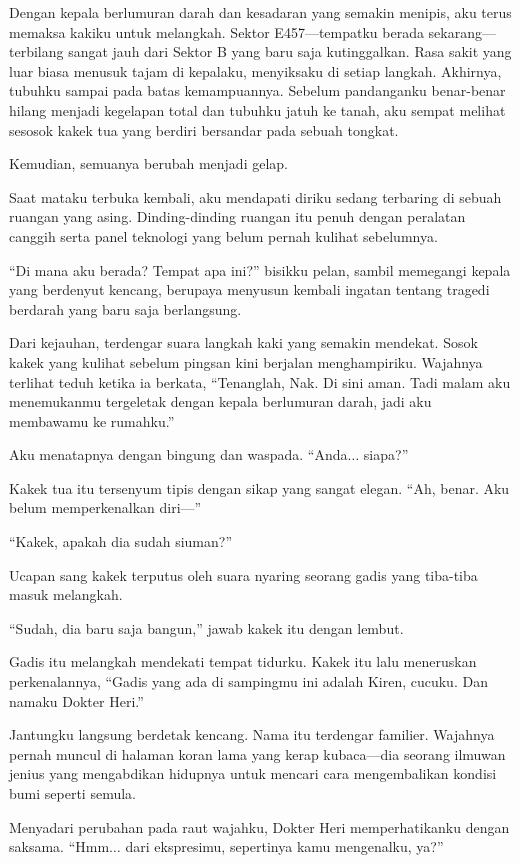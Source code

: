 Dengan kepala berlumuran darah dan kesadaran yang semakin menipis, aku terus memaksa kakiku untuk melangkah. Sektor E457—tempatku berada sekarang—terbilang sangat jauh dari Sektor B yang baru saja kutinggalkan. Rasa sakit yang luar biasa menusuk tajam di kepalaku, menyiksaku di setiap langkah. Akhirnya, tubuhku sampai pada batas kemampuannya. Sebelum pandanganku benar-benar hilang menjadi kegelapan total dan tubuhku jatuh ke tanah, aku sempat melihat sesosok kakek tua yang berdiri bersandar pada sebuah tongkat.

Kemudian, semuanya berubah menjadi gelap.

Saat mataku terbuka kembali, aku mendapati diriku sedang terbaring di sebuah ruangan yang asing. Dinding-dinding ruangan itu penuh dengan peralatan canggih serta panel teknologi yang belum pernah kulihat sebelumnya.

``Di mana aku berada? Tempat apa ini?'' bisikku pelan, sambil memegangi kepala yang berdenyut kencang, berupaya menyusun kembali ingatan tentang tragedi berdarah yang baru saja berlangsung.

Dari kejauhan, terdengar suara langkah kaki yang semakin mendekat. Sosok kakek yang kulihat sebelum pingsan kini berjalan menghampiriku. Wajahnya terlihat teduh ketika ia berkata, ``Tenanglah, Nak. Di sini aman. Tadi malam aku menemukanmu tergeletak dengan kepala berlumuran darah, jadi aku membawamu ke rumahku.''

Aku menatapnya dengan bingung dan waspada. ``Anda$\dots$ siapa?''

Kakek tua itu tersenyum tipis dengan sikap yang sangat elegan. ``Ah, benar. Aku belum memperkenalkan diri—''

``Kakek, apakah dia sudah siuman?''

Ucapan sang kakek terputus oleh suara nyaring seorang gadis yang tiba-tiba masuk melangkah.

``Sudah, dia baru saja bangun,'' jawab kakek itu dengan lembut.

Gadis itu melangkah mendekati tempat tidurku. Kakek itu lalu meneruskan perkenalannya, ``Gadis yang ada di sampingmu ini adalah Kiren, cucuku. Dan namaku Dokter Heri.''

Jantungku langsung berdetak kencang. Nama itu terdengar familier. Wajahnya pernah muncul di halaman koran lama yang kerap kubaca—dia seorang ilmuwan jenius yang mengabdikan hidupnya untuk mencari cara mengembalikan kondisi bumi seperti semula.

Menyadari perubahan pada raut wajahku, Dokter Heri memperhatikanku dengan saksama. ``Hmm$\dots$ dari ekspresimu, sepertinya kamu mengenalku, ya?''

